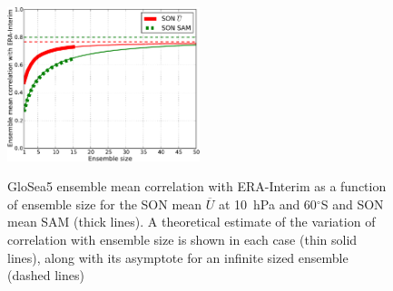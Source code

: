 \begin{figure}[t]
  \noindent\includegraphics[width=0.5\textwidth,angle=0]{figures/GloSea5/corr_ens_size_crop.pdf}\\
  \caption[Variation of GloSea5 forecast skill with ensemble size]{GloSea5 ensemble mean correlation with ERA-Interim as a function of ensemble size for the SON mean $\overline{U}$ at 10~hPa and 60$^{\circ}$S and SON mean SAM (thick lines). A theoretical estimate of the variation of correlation with ensemble size is shown in each case (thin solid lines), along with its asymptote for an infinite sized ensemble (dashed lines)}\label{Fig8}
\end{figure}

